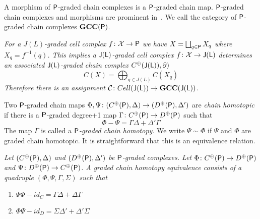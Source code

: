 A morphism of ${\mathsf P}$-graded chain complexes is a ${\mathsf P}$-graded chain map.   ${\mathsf P}$-graded chain complexes and morphisms are prominent in~\cite{fran, robbin:salamon2}.  We call the category of ${\mathsf P}$-graded chain complexes ${\bf GCC}({\mathsf P})$.  

\begin{ex}
{\em
For a $J(L)$-graded cell complex $f\colon {\mathcal X}\to {\mathsf P}$ we have $X=\bigsqcup_{q\in {\mathsf P}} X_q$ where $X_q=f^{-1}(q)$.   This implies a ${\mathsf J}({\mathsf L})$-graded cell complex $f\colon {\mathcal X}\to {\mathsf J}({\mathsf L})$ determines an associated ${\mathsf J}({\mathsf L})$-graded chain complex $C^\oplus({\mathsf J}({\mathsf L})),\partial)$ 
\[
C(X) = \bigoplus_{q\in J(L)} C(X_q)
\]
Therefore there is an assignment ${\mathcal C}\colon Cell({\mathsf J}({\mathsf L}))\to {\bf GCC}({\mathsf J}({\mathsf L}))$. 
}
\end{ex}


 Two ${\mathsf P}$-graded chain maps $\Phi,\Psi\colon (C^\oplus({\mathsf P}),\Delta)\to (D^\oplus({\mathsf P}),\Delta')$ are {\em chain homotopic} if there  is a ${\mathsf P}$-graded degree+1 map $\Gamma\colon C^\oplus({\mathsf P})\to D^\oplus({\mathsf P})$ such that 
\[
\Phi-\Psi = \Gamma\Delta + \Delta'\Gamma
\]
 The map $\Gamma$ is called a {\em ${\mathsf P}$-graded chain homotopy}.  We write $\Psi\sim \Phi$ if $\Psi$ and $\Phi$ are graded chain homotopic.  It is straightforward that this is an equivalence relation.
 
 \begin{defn}
 {\em
Let $(C^\oplus({\mathsf P}),\Delta)$ and $(D^\oplus({\mathsf P}),\Delta')$ be ${\mathsf P}$-graded complexes.  Let $\Phi\colon C^\oplus({\mathsf P})\to D^\oplus({\mathsf P})$ and $\Psi\colon D^\oplus({\mathsf P})\to C^\oplus({\mathsf P})$.  A {\em graded chain homotopy equivalence} consists of a quadruple $(\Phi,\Psi,\Gamma,\Sigma)$ such that
\begin{enumerate}
\item $\Psi\Phi - id_C = \Gamma\Delta + \Delta \Gamma$
\item $\Phi\Psi - id_D = \Sigma\Delta' + \Delta'\Sigma$
\end{enumerate}
}
 \end{defn}
 
